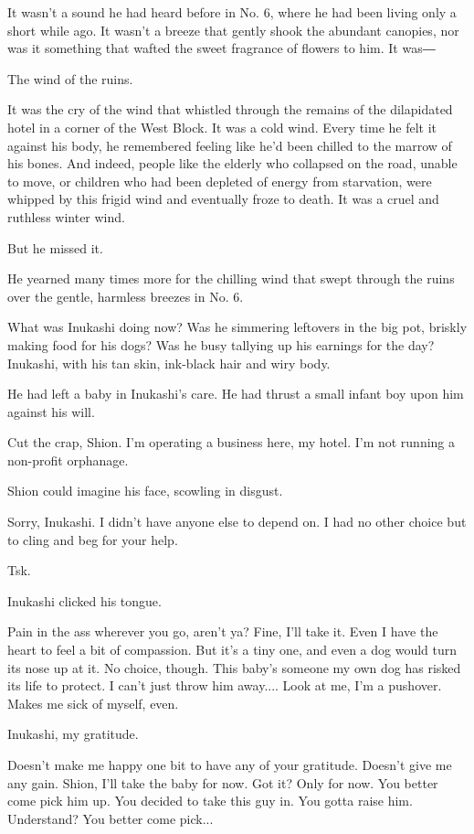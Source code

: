 It wasn't a sound he had heard before in No. 6, where he had been living
only a short while ago. It wasn't a breeze that gently shook the
abundant canopies, nor was it something that wafted the sweet fragrance
of flowers to him. It was―

The wind of the ruins.

It was the cry of the wind that whistled through the remains of the
dilapidated hotel in a corner of the West Block. It was a cold wind.
Every time he felt it against his body, he remembered feeling like he'd
been chilled to the marrow of his bones. And indeed, people like the
elderly who collapsed on the road, unable to move, or children who had
been depleted of energy from starvation, were whipped by this frigid
wind and eventually froze to death. It was a cruel and ruthless winter
wind.

But he missed it.

He yearned many times more for the chilling wind that swept through the
ruins over the gentle, harmless breezes in No. 6.

What was Inukashi doing now? Was he simmering leftovers in the big pot,
briskly making food for his dogs? Was he busy tallying up his earnings
for the day? Inukashi, with his tan skin, ink-black hair and wiry body.

He had left a baby in Inukashi's care. He had thrust a small infant boy
upon him against his will.

Cut the crap, Shion. I'm operating a business here, my hotel. I'm not
running a non-profit orphanage.

Shion could imagine his face, scowling in disgust.

Sorry, Inukashi. I didn't have anyone else to depend on. I had no other
choice but to cling and beg for your help.

Tsk.

Inukashi clicked his tongue.

Pain in the ass wherever you go, aren't ya? Fine, I'll take it. Even I
have the heart to feel a bit of compassion. But it's a tiny one, and
even a dog would turn its nose up at it. No choice, though. This baby's
someone my own dog has risked its life to protect. I can't just throw
him away.... Look at me, I'm a pushover. Makes me sick of myself, even.

Inukashi, my gratitude.

Doesn't make me happy one bit to have any of your gratitude. Doesn't
give me any gain. Shion, I'll take the baby for now. Got it? Only for
now. You better come pick him up. You decided to take this guy in. You
gotta raise him. Understand? You better come pick...

